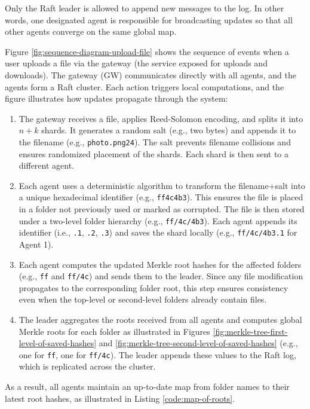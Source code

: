 Only the Raft leader is allowed to append new messages to the log. In other words, one designated agent is responsible for broadcasting updates so that all other agents converge on the same global map.

Figure \ref{fig:sequence-diagram-upload-file} shows the sequence of events when a user uploads a file via the gateway (the service exposed for uploads and downloads). The gateway (GW) communicates directly with all agents, and the agents form a Raft cluster. Each action triggers local computations, and the figure illustrates how updates propagate through the system:

\renewcommand{\labelenumi}{\textbf{(\theenumi)}}
\begin{enumerate}
    \item The gateway receives a file, applies Reed-Solomon encoding, and splits it into $n+k$ shards. It generates a random salt (e.g., two bytes) and appends it to the filename (e.g., \texttt{photo.png24}). The salt prevents filename collisions and ensures randomized placement of the shards. Each shard is then sent to a different agent.
    \item Each agent uses a deterministic algorithm to transform the filename+salt into a unique hexadecimal identifier (e.g., \texttt{ff4c4b3}). This ensures the file is placed in a folder not previously used or marked as corrupted. The file is then stored under a two-level folder hierarchy (e.g., \texttt{ff/4c/4b3}). Each agent appends its identifier (i.e., \texttt{.1}, \texttt{.2}, \texttt{.3}) and saves the shard locally (e.g., \texttt{ff/4c/4b3.1} for Agent 1).
    \item Each agent computes the updated Merkle root hashes for the affected folders (e.g., \texttt{ff} and \texttt{ff/4c}) and sends them to the leader. Since any file modification propagates to the corresponding folder root, this step ensures consistency even when the top-level or second-level folders already contain files.
    \item The leader aggregates the roots received from all agents and computes global Merkle roots for each folder as illustrated in Figures \ref{fig:merkle-tree-first-level-of-saved-hashes} and \ref{fig:merkle-tree-second-level-of-saved-hashes} (e.g., one for \texttt{ff}, one for \texttt{ff/4c}). The leader appends these values to the Raft log, which is replicated across the cluster. 
\end{enumerate}

As a result, all agents maintain an up-to-date map from folder names to their latest root hashes, as illustrated in Listing \ref{code:map-of-roots}.

